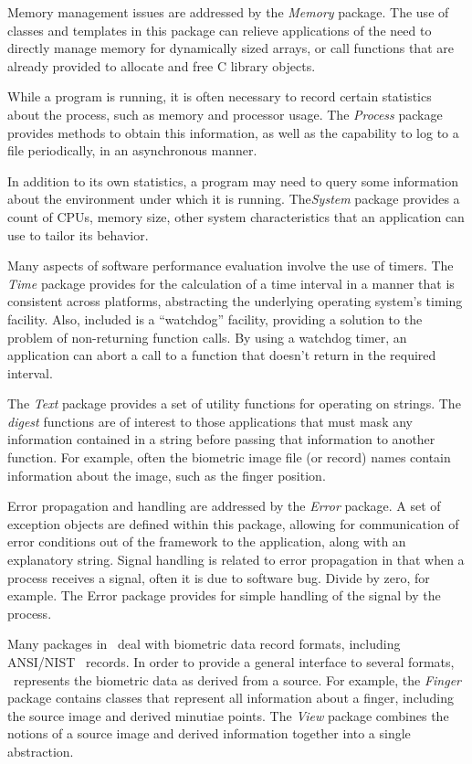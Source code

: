 Memory management issues are addressed by the {\em Memory} package. The use
of classes and templates in this package can relieve applications of the need
to directly manage memory for dynamically sized arrays, or call functions
that are already provided to allocate and free C library objects.

While a program is running, it is often necessary to record certain statistics
about the process, such as memory and processor usage. The {\em Process}
package provides methods to obtain this information, as well as the capability
to log to a file periodically, in an asynchronous manner.

In addition to its own statistics, a program may need to query some
information about the environment under which it is running. The{\em System}
package provides a count of CPUs, memory size, other system characteristics
that an application can use to tailor its behavior.

Many aspects of software performance evaluation involve the use of timers. The
{\em Time} package provides for the calculation of a time interval in a manner
that is consistent across platforms, abstracting the underlying operating
system's timing facility. Also, included is a ``watchdog'' facility, providing
a solution to the problem of non-returning function calls. By using a watchdog
timer, an application can abort a call to a function that doesn't return in
the required interval.

The {\em Text} package provides a set of utility functions for operating on
strings. The {\em digest} functions are of interest to
those applications that must mask any information contained in a string before
passing that information to another function. For example, often the biometric
image file (or record) names contain information about the image, such as the
finger position.

Error propagation and handling are addressed by the {\em Error} package. A set
of exception objects are defined within this package, allowing for communication
of error conditions out of the framework to the application, along with an
explanatory string. Signal handling is related to error propagation in that
when a process receives a signal, often it is due to software bug. Divide by
zero, for example. The Error package provides for simple handling of the signal 
by the process.

Many packages in \sname\ deal with biometric data record formats, including
ANSI/NIST~\cite{std::an2k} records. In order to provide a general interface
to several formats, \sname\ represents the biometric data as derived from
a source. For example, the {\em Finger} package contains classes that represent
all information about a finger, including the source image and derived
minutiae points. The {\em View} package combines the notions of a source
image and derived information together into a single abstraction.

